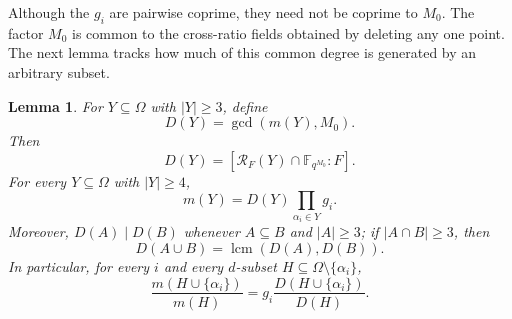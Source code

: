 \documentclass[11pt,onecolumn]{IEEEtran}
\newtheorem{lemma}{Lemma}
\newcommand{\lcmop}{\operatorname{lcm}}
\newcommand{\crf}{\mathscr R}
\begin{document}
Although the $g_i$ are pairwise coprime, they need not be
coprime to $M_0$. The factor $M_0$ is common to the cross-ratio
fields obtained by deleting any one point.  The next lemma tracks
how much of this common degree is generated by an arbitrary subset.

\begin{lemma}
\label{lem:shared-degree-factorization}
For $Y\subseteq\Omega$ with $|Y|\ge3$, define
\[
D(Y)=\gcd(m(Y),M_0).
\]
Then
\[
D(Y)
=[\crf_F(Y)\cap\mathbb F_{q^{M_0}}:F].
\]
For every $Y\subseteq\Omega$ with $|Y|\ge4$,
\begin{equation}
m(Y)=D(Y)\prod_{\alpha_i\in Y}g_i.
\label{eq:residual-factorization-main}
\end{equation}
Moreover, $D(A)\mid D(B)$ whenever
$A\subseteq B$ and $|A|\ge3$; if $|A\cap B|\ge3$, then
\[
D(A\cup B)
=\lcmop(D(A),D(B)).
\]
In particular, for every $i$ and every $d$-subset
$H\subseteq\Omega\setminus\{\alpha_i\}$,
\begin{equation}
\frac{m(H\cup\{\alpha_i\})}{m(H)}
=g_i\frac{D(H\cup\{\alpha_i\})}{D(H)}.
\label{eq:residual-ratio-main}
\end{equation}
\end{lemma}
\end{document}
